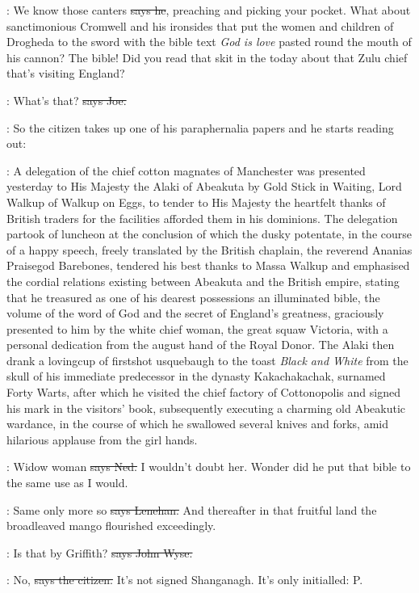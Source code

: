 \citizen:
We know those canters
\sout{says he},
preaching and picking your pocket.
What about sanctimonious Cromwell and his ironsides that put the women
and children of Drogheda to the sword with the bible text \emph{God is love}
pasted round the mouth of his cannon?
The bible!
Did you read that skit in the  today
about that Zulu chief that's visiting England?

\joe:
What's that?
\sout{says Joe.}

\Nq:
So the citizen takes up one of his paraphernalia papers and he starts reading out:

\citizen:
A delegation of the chief cotton magnates of Manchester was presented
yesterday to His Majesty the Alaki of Abeakuta by Gold Stick in Waiting,
Lord Walkup of Walkup on Eggs,
to tender to His Majesty
the heartfelt thanks of British traders
for the facilities afforded them in his dominions.
The delegation partook of luncheon at the conclusion
of which the dusky potentate,
in the course of a happy speech,
freely translated by the British chaplain,
the reverend Ananias Praisegod Barebones,
tendered his best thanks to Massa Walkup
and emphasised the cordial relations existing between Abeakuta and the British empire,
stating that he treasured as one of his dearest possessions an illuminated bible,
the volume of the word of God
and the secret of England's greatness,
graciously presented to him by the white chief woman,
the great squaw Victoria,
with a personal dedication from the august hand of the Royal Donor.
The Alaki then drank a lovingcup of firstshot usquebaugh
to the toast \emph{Black and White}
from the skull of his immediate predecessor
in the dynasty Kakachakachak,
surnamed Forty Warts,
after which he visited the chief factory of Cottonopolis
and signed his mark in the visitors' book,
subsequently executing a charming old Abeakutic wardance,
in the course of which he swallowed several knives and forks,
amid hilarious applause from the girl hands.

\lambert:
Widow woman
\sout{says Ned.}
I wouldn't doubt her.
Wonder did he put that bible to the same use as I would.

\lenehan:
Same only more so
\sout{says Lenehan.}
And thereafter in that fruitful land
the broadleaved mango flourished exceedingly.

\johnwyse:
Is that by Griffith?
\sout{says John Wyse.}

\citizen:
No,
\sout{says the citizen.}
It's not signed Shanganagh.
It's only initialled:
P.

